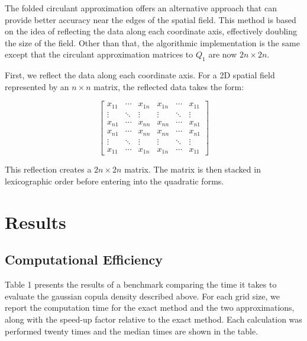 \documentclass[journal=,manuscript=]{achemso}
\begin{document}
The folded circulant approximation offers an alternative approach that
can provide better accuracy near the edges of the spatial field. This
method is based on the idea of reflecting the data along each coordinate
axis, effectively doubling the size of the field. Other than that, the
algorithmic implementation is the same except that the circulant
approximation matrices to \(Q_1\) are now \(2n \times 2n\).

First, we reflect the data along each coordinate axis. For a 2D spatial
field represented by an \(n \times n\) matrix, the reflected data takes
the form:

\[
\begin{bmatrix}
x_{11} & \cdots & x_{1n} & x_{1n} & \cdots & x_{11} \\
\vdots & \ddots & \vdots & \vdots & \ddots & \vdots \\
x_{n1} & \cdots & x_{nn} & x_{nn} & \cdots & x_{n1} \\
x_{n1} & \cdots & x_{nn} & x_{nn} & \cdots & x_{n1} \\
\vdots & \ddots & \vdots & \vdots & \ddots & \vdots \\
x_{11} & \cdots & x_{1n} & x_{1n} & \cdots & x_{11}
\end{bmatrix}
\]

This reflection creates a \(2n \times 2n\) matrix. The matrix is then
stacked in lexicographic order before entering into the quadratic forms.

\section{Results}\label{results}

\subsection{Computational Efficiency}\label{computational-efficiency}

Table 1 presents the results of a benchmark comparing the time it takes
to evaluate the gaussian copula density described above. For each grid
size, we report the computation time for the exact method and the two
approximations, along with the speed-up factor relative to the exact
method. Each calculation was performed twenty times and the median times
are shown in the table.
\end{document}
